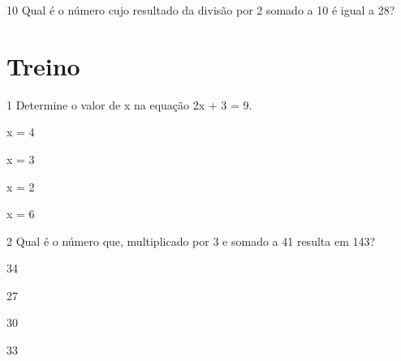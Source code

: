 \num{10} Qual é o número cujo resultado da divisão por 2 somado a 10 é igual
a 28?


\section*{Treino}

\num{1} Determine o valor de x na equação 2x + 3 = 9.


\begin{multicols}{4}
\begin{escolha}[itemsep=0pt]
\item x = 4 
\item x = 3 
\item x = 2 
\item x = 6
\end{escolha}
\end{multicols}



\num{2} Qual é o número que, multiplicado por 3 e somado a 41 resulta em 143?

\begin{multicols}{4}
\begin{escolha}[itemsep=0pt]
\item 34
\item 27
\item 30
\item 33
\end{escolha}
\end{multicols}

